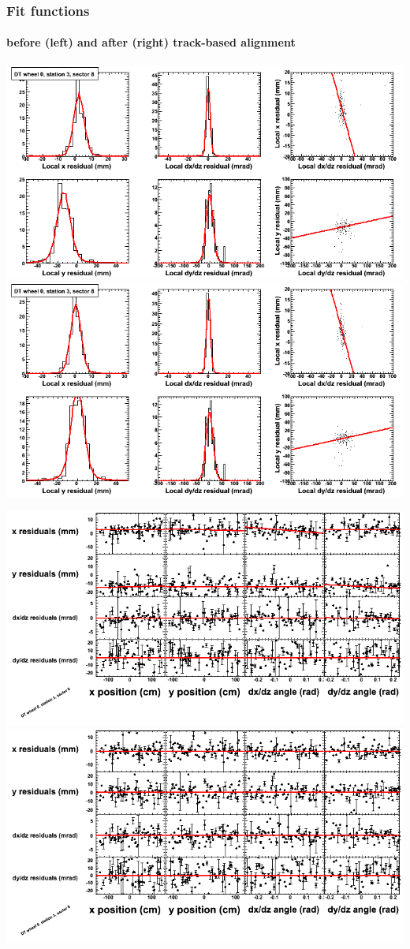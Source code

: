 \documentclass[compress]{beamer}
\begin{document}
\begin{frame}
\frametitle{Fit functions}
\framesubtitle{before (left) and after (right) track-based alignment}
\includegraphics[width=0.5\linewidth]{fitfunctions_re01/MBwhCst3sec08_bellcurves.png} \includegraphics[width=0.5\linewidth]{fitfunctions_re05/MBwhCst3sec08_bellcurves.png}

\includegraphics[width=0.5\linewidth]{fitfunctions_re01/MBwhCst3sec08_polynomials.png} \includegraphics[width=0.5\linewidth]{fitfunctions_re05/MBwhCst3sec08_polynomials.png}
\end{frame}
\end{document}
